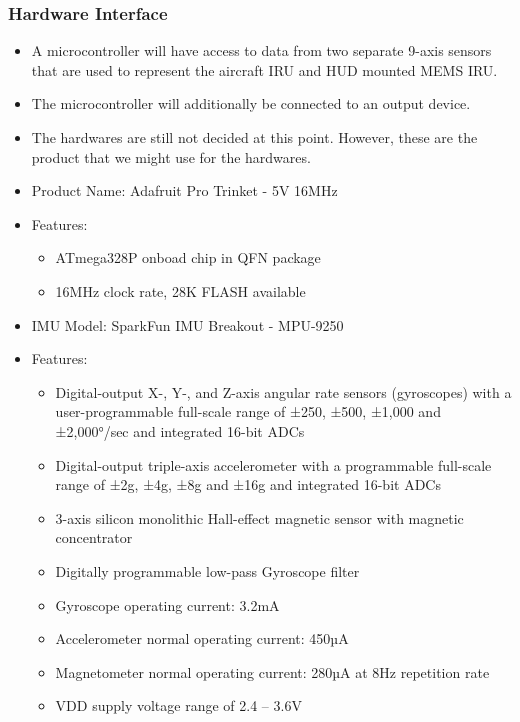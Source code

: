 \subsubsection{Hardware Interface}
\begin{itemize}
	\item 
	A microcontroller will have access to data from two separate 9-axis sensors that are used to represent the aircraft IRU and HUD mounted MEMS IRU.
	\item 
	The microcontroller will additionally be connected to an output device.
	\item 
	The hardwares are still not decided at this point. However, these are the product that we might use for the hardwares. 
	\item 
	Product Name: Adafruit Pro Trinket - 5V 16MHz \cite{trinket}
	\item 
	Features: 
	\begin{itemize}
		\item ATmega328P onboad chip in QFN package
		\item 16MHz clock rate, 28K FLASH available
	\end{itemize}	
	\item 
	IMU Model: SparkFun IMU Breakout - MPU-9250 \cite{mpu9250}
	\item 
	Features: 
	\begin{itemize}
		\item Digital-output X-, Y-, and Z-axis angular rate sensors (gyroscopes) with a user-programmable full-scale range of ±250, ±500, ±1,000 and ±2,000°/sec and integrated 16-bit ADCs

		\item Digital-output triple-axis accelerometer with a programmable full-scale range of ±2g, ±4g, ±8g and ±16g and integrated 16-bit ADCs

		\item 3-axis silicon monolithic Hall-effect magnetic sensor with magnetic concentrator

		\item Digitally programmable low-pass Gyroscope filter
		\item Gyroscope operating current: 3.2mA
		\item Accelerometer normal operating current: 450µA
		\item Magnetometer normal operating current: 280µA at 8Hz repetition rate
		\item VDD supply voltage range of 2.4 – 3.6V
		\\
	\end{itemize}	
\end{itemize}


